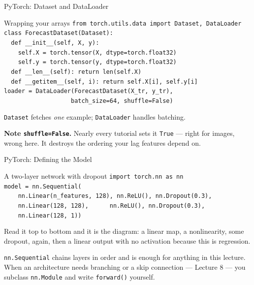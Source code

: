 \documentclass[aspectratio=169, 11pt]{beamer}
\begin{document}
\begin{frame}{PyTorch: Dataset and DataLoader}
  \begin{examplebox}{Wrapping your arrays}
    {\tiny\linespread{1.2}\selectfont
    \texttt{from torch.utils.data import Dataset, DataLoader}\\[2pt]
    \texttt{class ForecastDataset(Dataset):}\\
    \texttt{\ \ def \_\_init\_\_(self, X, y):}\\
    \texttt{\ \ \ \ self.X = torch.tensor(X, dtype=torch.float32)}\\
    \texttt{\ \ \ \ self.y = torch.tensor(y, dtype=torch.float32)}\\
    \texttt{\ \ def \_\_len\_\_(self): return len(self.X)}\\
    \texttt{\ \ def \_\_getitem\_\_(self, i): return self.X[i], self.y[i]}\\[3pt]
    \texttt{loader = DataLoader(ForecastDataset(X\_tr, y\_tr),}\\
    \texttt{\ \ \ \ \ \ \ \ \ \ \ \ \ \ \ \ \ \ \ batch\_size=64, shuffle=False)}
    }
  \end{examplebox}
  \texttt{Dataset} fetches \emph{one} example; \texttt{DataLoader} handles batching.

  \vspace{0.1cm}
  \textbf{Note \texttt{shuffle=False}.} Nearly every tutorial sets it \texttt{True} --- right for
  images, wrong here. It destroys the ordering your lag features depend on.
\end{frame}

\begin{frame}{PyTorch: Defining the Model}
  \begin{examplebox}{A two-layer network with dropout}
    {\scriptsize\linespread{1.15}\selectfont
    \texttt{import torch.nn as nn}\\[2pt]
    \texttt{model = nn.Sequential(}\\
    \texttt{\ \ \ \ nn.Linear(n\_features, 128), nn.ReLU(), nn.Dropout(0.3),}\\
    \texttt{\ \ \ \ nn.Linear(128, 128),\ \ \ \ \ \ nn.ReLU(), nn.Dropout(0.3),}\\
    \texttt{\ \ \ \ nn.Linear(128, 1))}
    }
  \end{examplebox}
  Read it top to bottom and it is the diagram: a linear map, a nonlinearity, some dropout,
  again, then a linear output with no activation because this is regression.

  \vspace{0.15cm}
  \texttt{nn.Sequential} chains layers in order and is enough for anything in this lecture. When
  an architecture needs branching or a skip connection --- Lecture 8 --- you subclass
  \texttt{nn.Module} and write \texttt{forward()} yourself.

  \vspace{0.15cm}
\end{frame}
\end{document}
